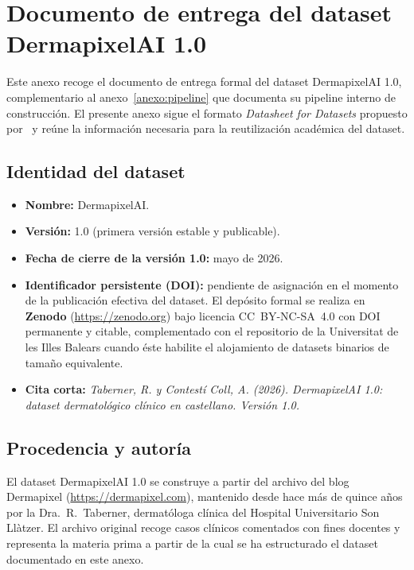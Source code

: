 
\chapter{Documento de entrega del dataset DermapixelAI 1.0}
\label{anexo:dataset-entrega}
\label{cap:anexoe}

Este anexo recoge el documento de entrega formal del dataset
DermapixelAI 1.0, complementario al anexo~\ref{anexo:pipeline} que
documenta su pipeline interno de construcción. El presente anexo
sigue el formato \emph{Datasheet for Datasets} propuesto
por~\cite{datasheets2018} y reúne la información necesaria para la
reutilización académica del dataset.

\section{Identidad del dataset}
\label{sec:dataset-identidad}

\begin{itemize}
\item \textbf{Nombre:} DermapixelAI.
\item \textbf{Versión:} 1.0 (primera versión estable y publicable).
\item \textbf{Fecha de cierre de la versión 1.0:} mayo de 2026.
\item \textbf{Identificador persistente (DOI):} pendiente de
asignación en el momento de la publicación efectiva del dataset.
El depósito formal se realiza en \textbf{Zenodo}
(\url{https://zenodo.org}) bajo licencia CC~BY-NC-SA~4.0 con DOI
permanente y citable, complementado con el repositorio de la
Universitat de les Illes Balears cuando éste habilite el alojamiento
de datasets binarios de tamaño equivalente.
\item \textbf{Cita corta:} \emph{Taberner, R. y Contestí Coll, A.
(2026). DermapixelAI 1.0: dataset dermatológico clínico en
castellano. Versión 1.0.}
\end{itemize}

\section{Procedencia y autoría}
\label{sec:dataset-procedencia}

El dataset DermapixelAI 1.0 se construye a partir del archivo del
blog Dermapixel (\url{https://dermapixel.com}), mantenido desde
hace más de quince años por la Dra.~R.~Taberner, dermatóloga
clínica del Hospital Universitario Son Llàtzer. El archivo original
recoge casos clínicos comentados con fines docentes y representa la
materia prima a partir de la cual se ha estructurado el dataset
documentado en este anexo.

